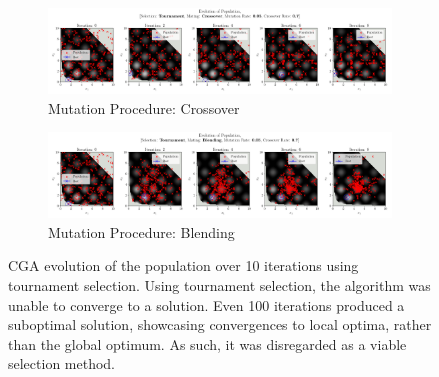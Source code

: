 \documentclass[10pt]{article}
\begin{document}
\begin{figure}[H]
    \centering
    \begin{subfigure}{0.85\textwidth}
        \centering
        \includegraphics[width=\textwidth]{../figures/KBF/10_iters/Tournament/Crossover/0.05_0.7_Population.png}
        \caption{Mutation Procedure: Crossover}
        \label{fig:CGA_flowchart_tournament_crossover}
    \end{subfigure}
    \begin{subfigure}{0.85\textwidth}
        \centering
        \includegraphics[width=\textwidth]{../figures/KBF/10_iters/Tournament/Blending/0.05_0.7_Population.png}
        \caption{Mutation Procedure: Blending}
        \label{fig:CGA_flowchart_tournament_blending}
    \end{subfigure}
    \captionsetup{justification=centering}
    \caption{CGA evolution of the population over 10 iterations using tournament selection. Using tournament selection, the algorithm was unable to converge to a solution. Even 100 iterations produced a suboptimal solution, showcasing convergences to local optima, rather than the global optimum. As such, it was disregarded as a viable selection method.}
    \label{fig:CGA_flowchart_tournament}
\end{figure}
\end{document}
